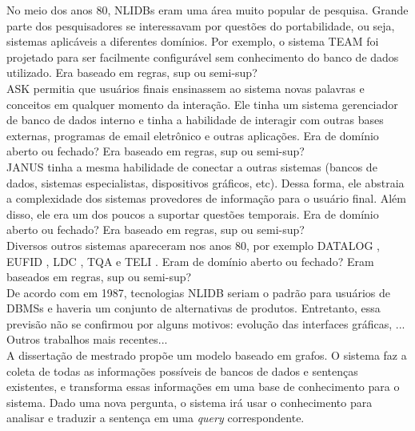 \documentclass{article}
\begin{document}
No meio dos anos 80, NLIDBs eram uma área muito popular de pesquisa. Grande parte dos pesquisadores se interessavam por questões do portabilidade, ou seja, sistemas aplicáveis a diferentes domínios. Por exemplo, o sistema TEAM \citep{grosz1983team} foi projetado para ser facilmente configurável sem conhecimento do banco de dados utilizado. Era baseado em regras, sup ou semi-sup?\\

ASK \citep{thompson1983introducing} permitia que usuários finais ensinassem ao sistema novas palavras e conceitos em qualquer momento da interação. Ele tinha um sistema gerenciador de banco de dados interno e tinha a habilidade de interagir com outras bases externas, programas de email eletrônico e outras aplicações. Era de domínio aberto ou fechado? Era baseado em regras, sup ou semi-sup?\\

JANUS \citep{hinrichs1988tense} tinha a mesma habilidade de conectar a outras sistemas (bancos de dados, sistemas especialistas, dispositivos gráficos, etc). Dessa forma, ele abstraia a complexidade dos sistemas provedores de informação para o usuário final. Além disso, ele era um dos poucos a suportar questões temporais. Era de domínio aberto ou fechado? Era baseado em regras, sup ou semi-sup?\\

Diversos outros sistemas apareceram nos anos 80, por exemplo DATALOG \citep{hafner1984interaction}, EUFID \citep{templeton1983problems}, LDC \citep{ballard1984ldc}, TQA \citep{damerau1981operating} e TELI \citep{ballard1986semantic}. Eram de domínio aberto ou fechado? Eram baseados em regras, sup ou semi-sup?\\

De acordo com \citep{johnson1984natural} em 1987, tecnologias NLIDB seriam o padrão para usuários de DBMSs e haveria um conjunto de alternativas de produtos. Entretanto, essa previsão não se confirmou por alguns motivos: evolução das interfaces gráficas, ...\\

Outros trabalhos mais recentes...\\

A dissertação de mestrado \citep{chandra2006natural} propõe um modelo baseado em grafos. O sistema faz a coleta de todas as informações possíveis de bancos de dados e sentenças existentes, e transforma essas informações em uma base de conhecimento para o sistema. Dado uma nova pergunta, o sistema irá usar o conhecimento para analisar e traduzir a sentença em uma \textit{query} correspondente. \\
\end{document}
